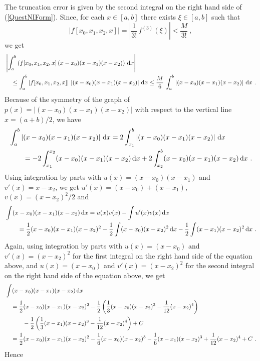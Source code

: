 {The truncation error is given by the second integral on the right hand
side of (\ref{QuestNIForm}). Since, for each $x\in [a,b]$ there exists
$\xi\in [a,b]$ such that
\[
\left| f[x_0,x_1,x_2,x] \right| =
\left| \frac{1}{3!}\,f^{(3)}(\xi) \right| < \frac{M}{3!} \ ,
\]
we get
\begin{align*}
&\left| \int_a^b \left(f[x_0,x_1,x_2,x]\,(x-x_0)(x-x_1)(x-x_2)
  \right)\,\mathrm{d}x \right| \\
&\quad \leq \int_a^b \left|f[x_0,x_1,x_2,x]\right|\,
\left|(x-x_0)(x-x_1)(x-x_2) \right|\,\mathrm{d}x
\leq \frac{M}{6} \, \int_a^b
\left|(x-x_0)(x-x_1)(x-x_2) \right|\,\mathrm{d}x \ .
\end{align*}
Because of the symmetry of the graph of
$p(x)=|(x-x_0)(x-x_1)(x-x_2)|$ with respect to the vertical line
$x=(a+b)/2$, we have
\begin{align*}
&\int_a^b \left|(x-x_0)(x-x_1)(x-x_2) \right|\,\mathrm{d}x 
= 2\int_{x_1}^b \left|(x-x_0)(x-x_1)(x-x_2) \right|\,\mathrm{d}x \\
&\qquad = - 2\int_{x_1}^{x_2} (x-x_0)(x-x_1)(x-x_2) \,\mathrm{d}x
+ 2\int_{x_2}^b (x-x_0)(x-x_1)(x-x_2) \,\mathrm{d}x \ .
\end{align*}
Using integration by parts with $u(x) = (x-x_0)(x-x_1)$ and
$v'(x) = x-x_2$, we get $u'(x) = (x-x_0) + (x-x_1)$,
$v(x) = (x-x_2)^2/2$ and
\begin{align*}
&\int (x-x_0)(x-x_1)(x-x_2) \,\mathrm{d}x
= u(x)v(x) - \int u'(x) v(x) \,\mathrm{d}x \\  
&\qquad = \frac{1}{2}(x-x_0)(x-x_1)(x-x_2)^2
- \frac{1}{2} \int (x-x_0)(x-x_2)^2\,\mathrm{d}x
- \frac{1}{2} \int (x-x_1)(x-x_2)^2\,\mathrm{d}x \ .
\end{align*}
Again, using integration by parts with $u(x) = (x-x_0)$ and
$v'(x) = (x-x_2)^2$ for the first integral on the right hand side
of the equation above, and $u(x) = (x-x_0)$ and $v'(x) = (x-x_2)^2$
for the second integral on the right hand side of the equation above,
we get
\begin{align*}
& \int (x-x_0)(x-x_1)(x-x_2) \,\mathrm{d}x \\
&\quad = \frac{1}{2}(x-x_0)(x-x_1)(x-x_2)^2 - \frac{1}{2}
\left( \frac{1}{3}(x-x_0)(x-x_2)^3 - \frac{1}{12}(x-x_2)^4\right) \\
&\quad\qquad - \frac{1}{2}
\left( \frac{1}{3}(x-x_1)(x-x_2)^3 - \frac{1}{12}(x-x_2)^4\right) + C \\
&\quad= \frac{1}{2}(x-x_0)(x-x_1)(x-x_2)^2 - \frac{1}{6}(x-x_0)(x-x_2)^3
- \frac{1}{6}(x-x_1)(x-x_2)^3
+ \frac{1}{12}(x-x_2)^4 + C \ .
\end{align*}
Hence
\begin{align*}

\end{align*}}

